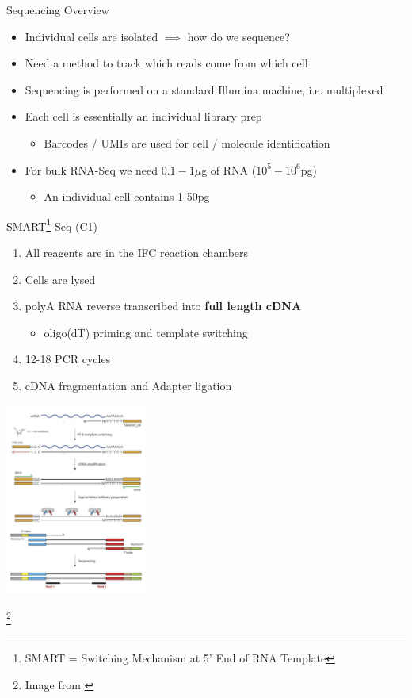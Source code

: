 \documentclass[aspectratio=169,11pt]{beamer}
\newcommand\blfootnote[1]{%
  \begingroup
  \renewcommand\thefootnote{}\footnote{#1}%
  \addtocounter{footnote}{-1}%
  \endgroup
}
\begin{document}
\begin{frame}{Sequencing Overview}

	\begin{itemize}
		\item Individual cells are isolated $\implies$ how do we sequence?
		\item Need a method to track which reads come from which cell
		\item Sequencing is performed on a standard Illumina machine, i.e. multiplexed
		\item Each cell is essentially an individual library prep
		\begin{itemize}
			\item Barcodes / UMIs are used for cell / molecule identification
		\end{itemize}
		\item For bulk RNA-Seq we need $0.1-1\mu$g of RNA ($10^5-10^6$pg)
		\begin{itemize}
			\item An individual cell contains 1-50pg
		\end{itemize}
	\end{itemize}

\end{frame}

\begin{frame}{SMART\footnote{SMART = Switching Mechanism at 5' End of RNA Template}-Seq (C1)}

	\begin{enumerate}
		\item All reagents are in the IFC reaction chambers
		\item Cells are lysed
		\item polyA RNA reverse transcribed into \textbf{full length cDNA}
		\begin{itemize}
			\item oligo(dT) priming and template switching
		\end{itemize}
		\item 12-18 PCR cycles
		\item cDNA fragmentation and Adapter ligation
	\end{enumerate}


\end{frame}

\begin{frame}
	\begin{center}
	\includegraphics[width=0.35\textwidth]{figures/SMARTSeq.png} 
	\end{center}
	\blfootnote{Image from \cite{pmid27442339}}
\end{frame}
\end{document}
